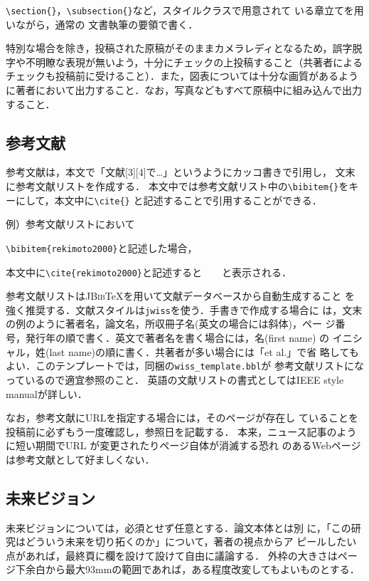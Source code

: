 \documentclass[twoside]{wiss}
\begin{document}
\verb|\section{}|，\verb|\subsection{}|など，スタイルクラスで用意されて
いる章立てを用いながら，通常の \LaTeXe 文書執筆の要領で書く．

特別な場合を除き，投稿された原稿がそのままカメラレディとなるため，誤字脱字や不明瞭な表現が無いよう，十分にチェックの上投稿すること（共著者によるチェックも投稿前に受けること）．また，図表については十分な画質があるように著者において出力すること．なお，写真などもすべて原稿中に組み込んで出力すること．

\subsection{参考文献}
参考文献は，本文で「文献[3][4]で…」というようにカッコ書きで引用し，
文末に参考文献リストを作成する．
本文中では参考文献リスト中の\verb|\bibitem{}|をキーにして，本文中に\verb|\cite{}|
と記述することで引用することができる．

例）参考文献リストにおいて

\verb|\bibitem{rekimoto2000}|と記述した場合，

本文中に\verb|\cite{rekimoto2000}|と記述すると　\cite{rekimoto2000}　と表示される．

参考文献リストは\textsc{JBib}\TeX を用いて文献データベースから自動生成すること
を強く推奨する．文献スタイルは\verb|jwiss|を使う．手書きで作成する場合に
は，文末の例のように著者名，論文名，所収冊子名(英文の場合には斜体)，ペー
ジ番号，発行年の順で書く．英文で著者名を書く場合には，名(first name) の
イニシャル，姓(last name)の順に書く．共著者が多い場合には「et al.」で省
略してもよい．このテンプレートでは，同梱の\verb|wiss_template.bbl|が
参考文献リストになっているので適宜参照のこと．
英語の文献リストの書式としてはIEEE style manual\cite{IEEE2014}が詳しい．

なお，参考文献にURLを指定する場合には，そのページが存在し
ていることを投稿前に必ずもう一度確認し，参照日を記載する．
本来，ニュース記事のように短い期間でURL が変更されたりページ自体が消滅する恐れ
のあるWebページは参考文献として好ましくない．

\subsection{未来ビジョン}
未来ビジョンについては，必須とせず任意とする．論文本体とは別
に，「この研究はどういう未来を切り拓くのか」について，著者の視点からア
ピールしたい点があれば，最終頁に欄を設けて設けて自由に議論する．
外枠の大きさはページ下余白から最大93mmの範囲であれば，ある程度改変してもよいものとする．
\end{document}
